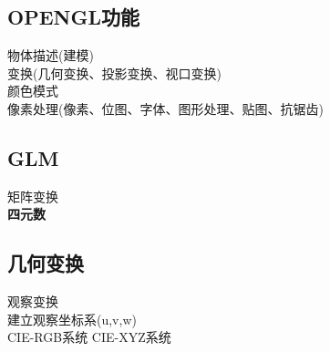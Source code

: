 \documentclass{article}
\begin{document}
\begin{CJK}{UTF8}{gbsn}
	\subsection{OPENGL功能}
	物体描述(建模)\\
	变换(几何变换、投影变换、视口变换)\\
	颜色模式\\
	像素处理(像素、位图、字体、图形处理、贴图、抗锯齿)\\
	\subsection{GLM}
	矩阵变换\\
	\textbf{四元数}\\
	\subsection{几何变换}
	观察变换\\
	建立观察坐标系(u,v,w)\\
	
	
		
	
	CIE-RGB系统
	CIE-XYZ系统
\end{CJK}
\end{document}
